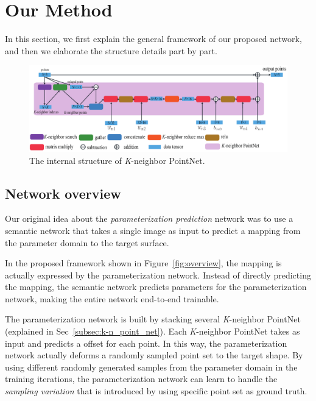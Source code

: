 \section{Our Method}
\label{sec:net}


In this section, we first explain the general framework of our proposed network, and then we elaborate the structure details part by part.

\begin{figure}[htbp]
	\centering
	\includegraphics[width=\linewidth]{img/net/k-n_pointnet}
	\caption{The internal structure of \textit{K}-neighbor PointNet. }
	\label{fig:knpointnet}
\end{figure}

\subsection{Network overview}
\label{subsec:overview}
Our original idea about the \emph{parameterization prediction} network was to use a semantic network that takes a single image as input to predict a mapping from the parameter domain to the target surface. 
%


In the proposed framework shown in Figure~\ref{fig:overview}, the mapping is actually expressed by the parameterization network. 
Instead of directly predicting the mapping, the semantic network predicts parameters for the parameterization network, making the entire network end-to-end trainable.

The parameterization network is built by stacking several \textit{K}-neighbor PointNet (explained in Sec~\ref{subsec:k-n_point_net}). 
Each \textit{K}-neighbor PointNet takes  as input and predicts a offset for each point. 
In this way, the parameterization network actually deforms a randomly sampled point set to the target shape.
%
By using different randomly generated samples from the parameter domain in the training iterations, the parameterization network can learn to handle the \textit{sampling variation} that is introduced by using specific point set as ground truth. 

